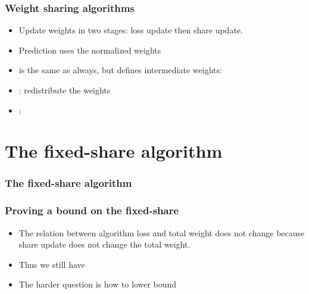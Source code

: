 \documentclass[handout]{beamer}
\begin{document}
\begin{frame}
\frametitle{Weight sharing algorithms}
\begin{itemize}
\item Update weights in two stages: loss update then share update.
\item Prediction uses the normalized  weights 
\item {} is the same as always, but defines intermediate  weights:
\R{\[
w_{t,i}^m = w_{t,i}^s e^{-\eta L(y_t,x_{t,i})}
\]}
\item {}: redistribute the weights
\item {}: 
\end{itemize}
\end{frame}

\section{The fixed-share algorithm}

\begin{frame}
\frametitle{The fixed-share algorithm}
\end{frame}

\begin{frame}
\frametitle{Proving a bound on the fixed-share}
\begin{itemize}
\item The relation between algorithm loss and total weight does not change
because share update does not change the total weight.
\item Thus we still have 
\R{\[
L_A \leq \frac{1}{\eta} \sum_{i=1}^n w_{l+1,i}^s
\]}
\item The harder question is how to lower bound 
\end{itemize}
\end{frame}
\end{document}
